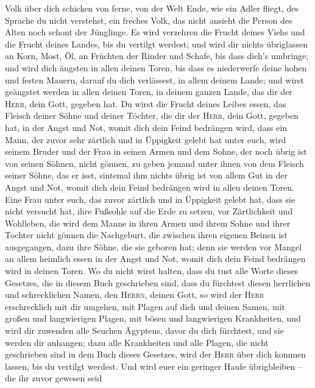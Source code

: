 Volk über dich schicken von ferne, von der Welt Ende, wie ein Adler
fliegt, des Sprache du nicht verstehst,  ein freches
Volk, das nicht ansieht die Person des Alten noch schont der Jünglinge.
 Es wird verzehren die Frucht deines Viehs und die Frucht
deines Landes, bis du vertilgt werdest; und wird dir nichts übriglassen
an Korn, Most, Öl, an Früchten der Rinder und Schafe, bis dass dich's
umbringe;  und wird dich ängsten in allen deinen Toren,
bis dass es niederwerfe deine hohen und festen Mauern, darauf du dich
verlässest, in allem deinem Lande; und wirst geängstet werden in allen
deinen Toren, in deinem ganzen Lande, das dir der \textsc{Herr}, dein
Gott, gegeben hat.  Du wirst die Frucht deines Leibes
essen, das Fleisch deiner Söhne und deiner Töchter, die dir der
\textsc{Herr}, dein Gott, gegeben hat, in der Angst und Not, womit dich
dein Feind bedrängen wird,  dass ein Mann, der zuvor sehr
zärtlich und in Üppigkeit gelebt hat unter euch, wird seinem Bruder und
der Frau in seinen Armen und dem Sohne, der noch übrig ist von seinen
Söhnen, nicht gönnen,  zu geben jemand unter ihnen von
dem Fleisch seiner Söhne, das er isst, sintemal ihm nichts übrig ist von
allem Gut in der Angst und Not, womit dich dein Feind bedrängen wird in
allen deinen Toren.  Eine Frau unter euch, das zuvor
zärtlich und in Üppigkeit gelebt hat, dass sie nicht versucht hat, ihre
Fußsohle auf die Erde zu setzen, vor Zärtlichkeit und Wohlleben, die
wird dem Manne in ihren Armen und ihrem Sohne und ihrer Tochter nicht
gönnen  die Nachgeburt, die zwischen ihren eigenen Beinen
ist ausgegangen, dazu ihre Söhne, die sie geboren hat; denn sie werden
vor Mangel an allem heimlich essen in der Angst und Not, womit dich dein
Feind bedrängen wird in deinen Toren.  Wo du nicht wirst
halten, dass du tust alle Worte dieses Gesetzes, die in diesem Buch
geschrieben sind, dass du fürchtest diesen herrlichen und schrecklichen
Namen, den \textsc{Herrn}, deinen Gott,  so wird der
\textsc{Herr} erschrecklich mit dir umgehen, mit Plagen auf dich und
deinen Samen, mit großen und langwierigen Plagen, mit bösen und
langwierigen Krankheiten,  und wird dir zuwenden alle
Seuchen Ägyptens, davor du dich fürchtest, und sie werden dir anhangen;
 dazu alle Krankheiten und alle Plagen, die nicht
geschrieben sind in dem Buch dieses Gesetzes, wird der \textsc{Herr}
über dich kommen lassen, bis du vertilgt werdest.  Und
wird euer ein geringer Haufe übrigbleiben -- die ihr zuvor gewesen seid
